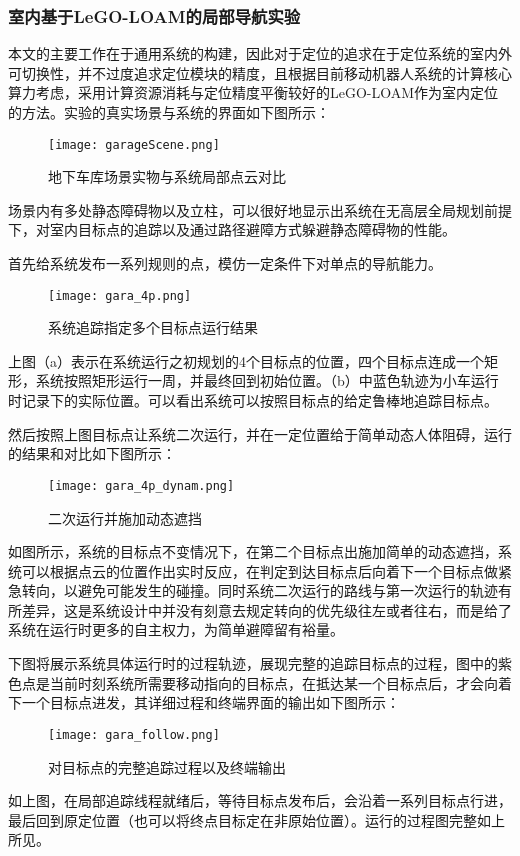 \subsubsection{室内基于LeGO-LOAM的局部导航实验}
本文的主要工作在于通用系统的构建，因此对于定位的追求在于定位系统的室内外可切换性，并不过度追求定位模块的精度，且根据目前移动机器人系统的计算核心算力考虑，采用计算资源消耗与定位精度平衡较好的LeGO-LOAM作为室内定位的方法。实验的真实场景与系统的界面如下图所示：

\begin{figure}[ht]
    \centering
    \texttt{[image: garageScene.png]}
    \caption{地下车库场景实物与系统局部点云对比}
  \end{figure}
场景内有多处静态障碍物以及立柱，可以很好地显示出系统在无高层全局规划前提下，对室内目标点的追踪以及通过路径避障方式躲避静态障碍物的性能。

首先给系统发布一系列规则的点，模仿一定条件下对单点的导航能力。

\begin{figure}[ht]
    \centering
    \texttt{[image: gara\_4p.png]}
    \caption{系统追踪指定多个目标点运行结果}
  \end{figure}

上图（a）表示在系统运行之初规划的4个目标点的位置，四个目标点连成一个矩形，系统按照矩形运行一周，并最终回到初始位置。（b）中蓝色轨迹为小车运行时记录下的实际位置。可以看出系统可以按照目标点的给定鲁棒地追踪目标点。

然后按照上图目标点让系统二次运行，并在一定位置给于简单动态人体阻碍，运行的结果和对比如下图所示：
\begin{figure}[ht]
    \centering
    \texttt{[image: gara\_4p\_dynam.png]}
    \caption{二次运行并施加动态遮挡}
  \end{figure}
如图所示，系统的目标点不变情况下，在第二个目标点出施加简单的动态遮挡，系统可以根据点云的位置作出实时反应，在判定到达目标点后向着下一个目标点做紧急转向，以避免可能发生的碰撞。同时系统二次运行的路线与第一次运行的轨迹有所差异，这是系统设计中并没有刻意去规定转向的优先级往左或者往右，而是给了系统在运行时更多的自主权力，为简单避障留有裕量。

下图将展示系统具体运行时的过程轨迹，展现完整的追踪目标点的过程，图中的紫色点是当前时刻系统所需要移动指向的目标点，在抵达某一个目标点后，才会向着下一个目标点进发，其详细过程和终端界面的输出如下图所示：

\begin{figure}[ht]
    \centering
    \texttt{[image: gara\_follow.png]}
    \caption{对目标点的完整追踪过程以及终端输出}
  \end{figure}
如上图，在局部追踪线程就绪后，等待目标点发布后，会沿着一系列目标点行进，最后回到原定位置（也可以将终点目标定在非原始位置）。运行的过程图完整如上所见。

